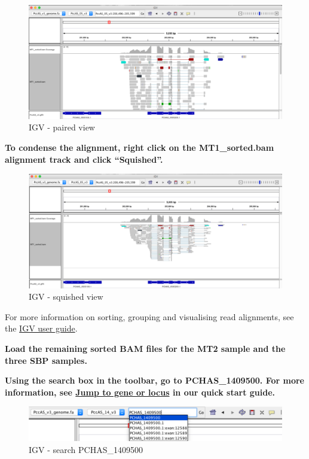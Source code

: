 \documentclass[11pt]{article}
\begin{document}
    \begin{figure}[!h]
\centering
\includegraphics{images/igv-mt1-paired.png}
\caption{IGV - paired view}
\end{figure}

\newpage

    \textbf{To condense the alignment, right click on the MT1\_sorted.bam
alignment track and click ``Squished''.}

    \begin{figure}[!h]
\centering
\includegraphics{images/igv-mt1-squished.png}
\caption{IGV - squished view}
\end{figure}

    For more information on sorting, grouping and visualising read
alignments, see the
\href{http://software.broadinstitute.org/software/igv/UserGuide}{IGV
user guide}.

\textbf{Load the remaining sorted BAM files for the MT2 sample and the
three SBP samples.}

\textbf{Using the search box in the toolbar, go to PCHAS\_1409500. For
more information, see
\href{https://github.com/sanger-pathogens/pathogen-informatics-training/blob/master/Notebooks/IGV/index.ipynb}{Jump
to gene or locus} in our quick start guide.}

    \begin{figure}[!h]
\centering
\includegraphics{images/igv-search-pchas1409500.png}
\caption{IGV - search PCHAS\_1409500}
\end{figure}
\end{document}
